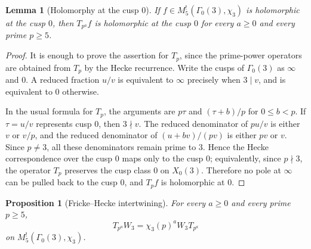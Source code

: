 \documentclass[11pt]{amsart}
\newtheorem{proposition}[theorem]{Proposition}
\newtheorem{lemma}[theorem]{Lemma}
\theoremstyle{remark}
\newcommand{\G}{\Gamma_0(3)}
\begin{document}
\begin{lemma}[Holomorphy at the cusp $0$]\label{lem:hecke-cusp0}
If $f\in M_5^!(\G,\chi_3)$ is holomorphic at the cusp $0$, then $T_{p^a}f$ is holomorphic at the cusp $0$ for every $a\ge0$ and every prime $p\ge5$.
\end{lemma}

\begin{proof}
It is enough to prove the assertion for $T_p$, since the prime-power operators are obtained from $T_p$ by the Hecke recurrence.  Write the cusps of $\Gamma_0(3)$ as $\infty$ and $0$.  A reduced fraction $u/v$ is equivalent to $\infty$ precisely when $3\mid v$, and is equivalent to $0$ otherwise.

In the usual formula for $T_p$, the arguments are $p\tau$ and $(\tau+b)/p$ for $0\le b<p$.  If $\tau=u/v$ represents cusp $0$, then $3\nmid v$.  The reduced denominator of $pu/v$ is either $v$ or $v/p$, and the reduced denominator of $(u+bv)/(pv)$ is either $pv$ or $v$.  Since $p\ne3$, all these denominators remain prime to $3$.  Hence the Hecke correspondence over the cusp $0$ maps only to the cusp $0$; equivalently, since $p\nmid3$, the operator $T_p$ preserves the cusp class $0$ on $X_0(3)$.  Therefore no pole at $\infty$ can be pulled back to the cusp $0$, and $T_pf$ is holomorphic at $0$.
\end{proof}

\begin{proposition}[Fricke--Hecke intertwining]\label{prop:fricke-hecke}
For every $a\ge0$ and every prime $p\ge5$,
\[
 T_{p^a}W_3=\chi_3(p)^a W_3T_{p^a}
\]
on $M_5^!(\G,\chi_3)$.
\end{proposition}
\end{document}

